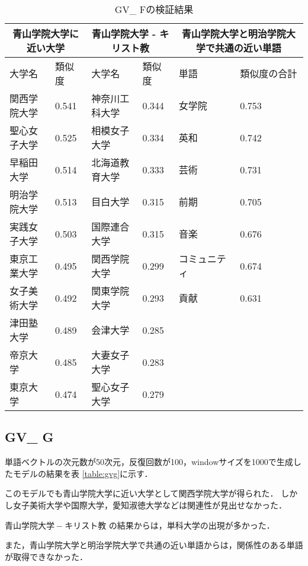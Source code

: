 \begin{table}[H]
\caption{GV\_ Fの検証結果}
\centering
\footnotesize
\begin{tabular}{ll|ll|ll}
\hline
\multicolumn{2}{c}{青山学院大学に近い大学} & \multicolumn{2}{c}{青山学院大学 - キリスト教} & \multicolumn{2}{c}{青山学院大学と明治学院大学で共通の近い単語}
\\ \hline
大学名 & 類似度 & 大学名 & 類似度 & 単語 & 類似度の合計
\\ \hline \hline
関西学院大学 & 0.541 & 神奈川工科大学 & 0.344 & 女学院 & 0.753\\
聖心女子大学 & 0.525 & 相模女子大学 & 0.334 & 英和 & 0.742\\
早稲田大学 & 0.514 & 北海道教育大学 & 0.333 & 芸術 & 0.731\\
明治学院大学 & 0.513 & 目白大学 & 0.315 & 前期 & 0.705\\
実践女子大学 & 0.503 & 国際連合大学 & 0.315 & 音楽 & 0.676\\
東京工業大学 & 0.495 & 関西学院大学 & 0.299 & コミュニティ & 0.674\\
女子美術大学 & 0.492 & 関東学院大学 & 0.293 & 貢献 & 0.631\\
津田塾大学 & 0.489 & 会津大学 & 0.285 & & \\
帝京大学 & 0.485 & 大妻女子大学 & 0.283 & & \\
東京大学 & 0.474 & 聖心女子大学 & 0.279 & & \\ \hline
\end{tabular}
\label{table:gvf}
\end{table}


\subsection{GV\_ G}
単語ベクトルの次元数が50次元，反復回数が100，windowサイズを1000で生成したモデルの結果を表 \ref{table:gvg}に示す．

このモデルでも青山学院大学に近い大学として関西学院大学が得られた．
しかし女子美術大学や国際大学，愛知淑徳大学などは関連性が見出せなかった．

$ 青山学院大学 - キリスト教 $ の結果からは，単科大学の出現が多かった．

また，青山学院大学と明治学院大学で共通の近い単語からは，関係性のある単語が取得できなかった．

